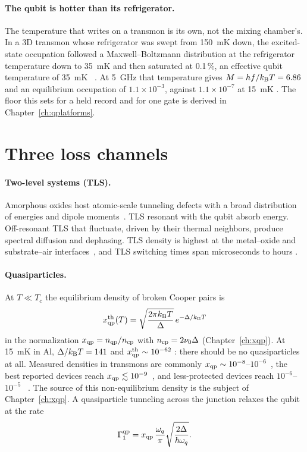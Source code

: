 \paragraph{The qubit is hotter than its refrigerator.} The temperature that writes on a transmon is its own, not the mixing chamber's. In a
3D transmon whose refrigerator was swept from 150~mK down, the excited-state occupation followed a Maxwell--Boltzmann distribution at the
refrigerator temperature down to 35~mK and then saturated at 0.1\,\%, an effective qubit temperature of 35~mK~\cite{Jin2015} \observed. At
5~GHz that temperature gives $M=hf/k_{\mathrm B} T=6.86$ and an equilibrium occupation of $1.1\times10^{-3}$, against $1.1\times10^{-7}$ at 15~mK
\calc. The floor this sets for a held record and for one gate is derived in Chapter~\ref{ch:qplatforms}.

\section{Three loss channels}

\paragraph{Two-level systems (TLS).} Amorphous oxides host atomic-scale tunneling defects
with a broad distribution of energies and dipole moments~\cite{Phillips1987,Muller2019}. TLS
resonant with the qubit absorb energy. Off-resonant TLS that fluctuate, driven by their
thermal neighbors, produce spectral diffusion and dephasing. TLS density is highest at the
metal--oxide and substrate--air interfaces~\cite{Wang2015TLS,Lisenfeld2019}, and TLS switching
times span microseconds to hours \observed.

\paragraph{Quasiparticles.} At $T\ll T_c$ the equilibrium density of broken Cooper pairs is~\cite{Glazman2021}
\begin{equation}
 x_{\mathrm{qp}}^{\mathrm{th}}(T)=\sqrt{\frac{2\pi k_{\mathrm B} T}{\Delta}}\,e^{-\Delta/k_{\mathrm B} T}
\end{equation}
in the normalization $x_{\mathrm{qp}}=n_{\mathrm{qp}}/n_{\mathrm{cp}}$ with $n_{\mathrm{cp}}=2\nu_0\Delta$ (Chapter~\ref{ch:xqp}).
At 15~mK in Al, $\Delta/k_{\mathrm B} T=141$ and $x_{\mathrm{qp}}^{\mathrm{th}}\sim10^{-62}$ \calc: there should be no
quasiparticles at all. Measured densities in transmons are commonly
$x_{\mathrm{qp}}\sim10^{-8}$--$10^{-6}$~\cite{Riste2013,Serniak2018}, the best reported devices reach
$x_{\mathrm{qp}}\lesssim10^{-9}$~\cite{Connolly2024}, and less-protected devices reach
$10^{-6}$--$10^{-5}$~\cite{Martinis2009,deVisser2011} \observed. The source of this non-equilibrium
density is the subject of Chapter~\ref{ch:xqp}. A quasiparticle tunneling across the
junction relaxes the qubit at the rate~\cite{Catelani2011}
\begin{equation}
 \Gamma_1^{\mathrm{qp}}=x_{\mathrm{qp}}\,\frac{\omega_q}{\pi}\sqrt{\frac{2\Delta}{\hbar\omega_q}} .
 \label{eq:catelani}
\end{equation}

